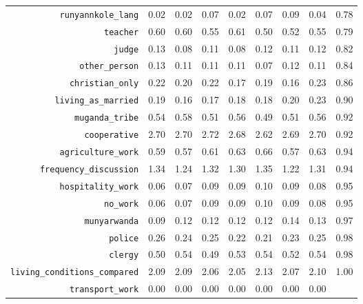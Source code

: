 \begin{longtable}{rrrrrrrrr}
  {\texttt{runyannkole\_lang}} & 0.02 & 0.02 & 0.07 & 0.02 & 0.07 & 0.09 & 0.04 & 0.78 \\ 
  {\texttt{teacher}} & 0.60 & 0.60 & 0.55 & 0.61 & 0.50 & 0.52 & 0.55 & 0.79 \\ 
  {\texttt{judge}} & 0.13 & 0.08 & 0.11 & 0.08 & 0.12 & 0.11 & 0.12 & 0.82 \\ 
  {\texttt{other\_person}} & 0.13 & 0.11 & 0.11 & 0.11 & 0.07 & 0.12 & 0.11 & 0.84 \\ 
  {\texttt{christian\_only}} & 0.22 & 0.20 & 0.22 & 0.17 & 0.19 & 0.16 & 0.23 & 0.86 \\ 
  {\texttt{living\_as\_married}} & 0.19 & 0.16 & 0.17 & 0.18 & 0.18 & 0.20 & 0.23 & 0.90 \\ 
  {\texttt{muganda\_tribe}} & 0.54 & 0.58 & 0.51 & 0.56 & 0.49 & 0.51 & 0.56 & 0.92 \\ 
  {\texttt{cooperative}} & 2.70 & 2.70 & 2.72 & 2.68 & 2.62 & 2.69 & 2.70 & 0.92 \\ 
  {\texttt{agriculture\_work}} & 0.59 & 0.57 & 0.61 & 0.63 & 0.66 & 0.57 & 0.63 & 0.94 \\ 
  {\texttt{frequency\_discussion}} & 1.34 & 1.24 & 1.32 & 1.30 & 1.35 & 1.22 & 1.31 & 0.94 \\ 
  {\texttt{hospitality\_work}} & 0.06 & 0.07 & 0.09 & 0.09 & 0.10 & 0.09 & 0.08 & 0.95 \\ 
  {\texttt{no\_work}} & 0.06 & 0.07 & 0.09 & 0.09 & 0.10 & 0.09 & 0.08 & 0.95 \\ 
  {\texttt{munyarwanda}} & 0.09 & 0.12 & 0.12 & 0.12 & 0.12 & 0.14 & 0.13 & 0.97 \\ 
  {\texttt{police}} & 0.26 & 0.24 & 0.25 & 0.22 & 0.21 & 0.23 & 0.25 & 0.98 \\ 
  {\texttt{clergy}} & 0.50 & 0.54 & 0.49 & 0.53 & 0.54 & 0.52 & 0.54 & 0.98 \\ 
  {\texttt{living\_conditions\_compared}} & 2.09 & 2.09 & 2.06 & 2.05 & 2.13 & 2.07 & 2.10 & 1.00 \\ 
  {\texttt{transport\_work}} & 0.00 & 0.00 & 0.00 & 0.00 & 0.00 & 0.00 & 0.00 &  \\ 
   \hline
\hline
\end{longtable}
